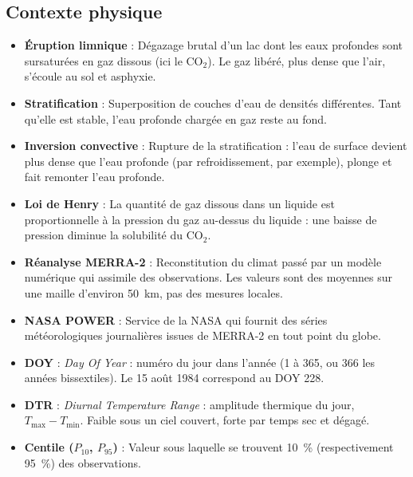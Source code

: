 \documentclass[12pt, a4paper]{article}
\begin{document}
\subsection*{Contexte physique}
\begin{itemize}[itemsep=3pt]
  \item \textbf{\color{NuitBleue}Éruption limnique} : Dégazage brutal d'un lac dont les eaux profondes sont sursaturées en gaz dissous (ici le CO$_2$). Le gaz libéré, plus dense que l'air, s'écoule au sol et asphyxie.
  \item \textbf{\color{NuitBleue}Stratification} : Superposition de couches d'eau de densités différentes. Tant qu'elle est stable, l'eau profonde chargée en gaz reste au fond.
  \item \textbf{\color{NuitBleue}Inversion convective} : Rupture de la stratification : l'eau de surface devient plus dense que l'eau profonde (par refroidissement, par exemple), plonge et fait remonter l'eau profonde.
  \item \textbf{\color{NuitBleue}Loi de Henry} : La quantité de gaz dissous dans un liquide est proportionnelle à la pression du gaz au-dessus du liquide : une baisse de pression diminue la solubilité du CO$_2$.
  \item \textbf{\color{NuitBleue}Réanalyse MERRA-2} : Reconstitution du climat passé par un modèle numérique qui assimile des observations. Les valeurs sont des moyennes sur une maille d'environ 50~km, pas des mesures locales.
  \item \textbf{\color{NuitBleue}NASA POWER} : Service de la NASA qui fournit des séries météorologiques journalières issues de MERRA-2 en tout point du globe.
  \item \textbf{\color{NuitBleue}DOY} : \emph{Day Of Year} : numéro du jour dans l'année (1 à 365, ou 366 les années bissextiles). Le 15 août 1984 correspond au DOY 228.
  \item \textbf{\color{NuitBleue}DTR} : \emph{Diurnal Temperature Range} : amplitude thermique du jour, $T_{\max} - T_{\min}$. Faible sous un ciel couvert, forte par temps sec et dégagé.
  \item \textbf{\color{NuitBleue}Centile ($P_{10}$, $P_{95}$)} : Valeur sous laquelle se trouvent 10~\% (respectivement 95~\%) des observations.
\end{itemize}
\end{document}
